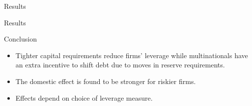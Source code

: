 \documentclass{beamer}
\begin{document}
\begin{frame}{Results}
\begin{center}
		\begin{tiny}
		
	\end{tiny}
\end{center}

\end{frame}

\begin{frame}{Results}
\begin{center}
	\begin{tiny}
		
	\end{tiny}
\end{center}
\end{frame}

\begin{frame}{Conclusion}
\begin{itemize}
	\item Tighter capital requirements reduce firms' leverage while multinationals have an extra incentive to shift debt due to moves in reserve requirements. 
	\item The domestic effect is found to be stronger for riskier firms.
	\item Effects depend on choice of leverage measure.
\end{itemize}
\end{frame}
\end{document}
